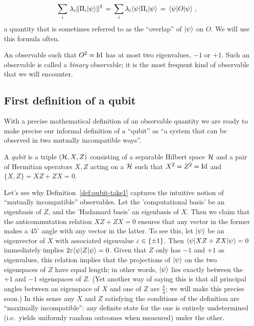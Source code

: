 \[ \sum_i \,\lambda_i \|\Pi_i |\psi\rangle\|^2 \,=\, \sum_i \lambda_i \langle\psi| \Pi_i |\psi\rangle \,=\, \langle\psi| O |\psi\rangle\;,\]
a quantity that is sometimes referred to as the ``overlap'' of $|\psi\rangle$ on $O$. We will use this formula often. 

An observable such that $O^2=\mathop{\rm Id}\nolimits$ has at most two eigenvalues, $-1$ or $+1$. Such an observable is called a \emph{binary} observable; it is the most frequent kind of observable that we will encounter. 

\subsection{First definition of a qubit}

With a precise mathematical definition of an observable quantity we are ready to make precise our informal definition of a ``qubit'' as ``a system that can be observed in two mutually incompatible ways''. 

\begin{definition}\label{def:qubit-take1}
A \emph{qubit} is a triple $(\mathcal{H},X,Z)$ consisting of a separable Hilbert space $\mathcal{H}$ and a pair of Hermitian operators $X,Z$ acting on a $\mathcal{H}$ such that $X^2=Z^2=\mathop{\rm Id}\nolimits$ and $\{X,Z\}=XZ+ZX=0$.
\end{definition}

Let's see why 
Definition~\ref{def:qubit-take1} captures the intuitive notion of ``mutually incompatible'' observables. Let the 'computational basis' be an eigenbasis of $Z$, and the 'Hadamard basis' an eigenbasis of $X$. Then we claim that the anticommutation relation $XZ+ZX=0$ ensures that any vector in the former makes a $45^{\circ}$ angle with any vector in the latter. To see this, let $|\psi\rangle$ be an eigenvector of $X$ with associated eigenvalue $\varepsilon\in\{\pm 1\}$. Then $\langle\psi| XZ + ZX |\psi\rangle = 0$ immediately implies $2\varepsilon\langle\psi| Z |\psi\rangle=0$. Given that $Z$ only has $-1$ and $+1$ as eigenvalues, this relation implies that the projections of $|\psi\rangle$ on the two eigenspaces of $Z$ have equal length; in other words, $|\psi\rangle$ lies exactly between the $+1$ and $-1$ eigenspaces of $Z$. (Yet another way of saying this is that all principal angles between an eigenspace of $X$ and one of $Z$ are $\frac{\pi}{4}$; we will make this precise soon.) In this sense any $X$ and $Z$ satisfying the conditions of the definition are ``maximally incompatible'': any definite state for the one is entirely undetermined (i.e.\ yields uniformly random outcomes when measured) under the other. 

